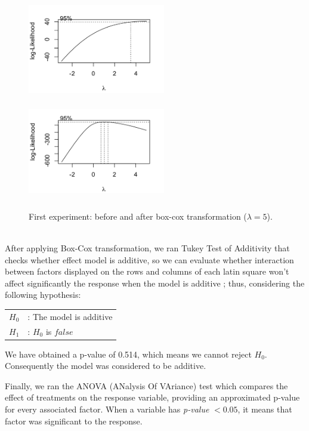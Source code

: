 \begin{figure}
\includegraphics[height=4.5cm, width=6cm]{img/u2.png}
\hfill
\includegraphics[height=4.3cm, width=6cm]{img/u2boxcox.png}
\caption{First experiment: before and after box-cox transformation ($\lambda = 5$).}
\end{figure}
\\

After applying Box-Cox transformation, we ran Tukey Test of Additivity that checks whether effect model is additive, so we can evaluate whether interaction between factors displayed on the rows and columns of each latin square won't affect significantly the response when the model is additive \cite{box}; thus, considering the following hypothesis:

\begin{tabular}{ll}
$H_{0}$ & : The model is additive \\
$H_{1}$ & : $H_{0}$ is $false$ \\
\end{tabular}

We have obtained a p-value of 0.514, which means we cannot reject $H_{0}$. Consequently the model was considered to be additive.

Finally, we ran the ANOVA (ANalysis Of VAriance) test which compares the effect of treatments on the response variable, providing an approximated p-value for every associated factor. When a variable has \emph{p-value} $< 0.05$, it means that factor was significant to the response.

